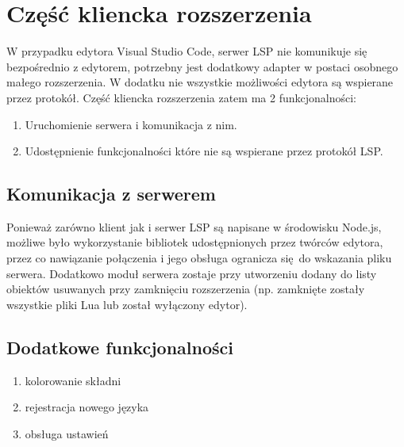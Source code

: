 \chapter{Część kliencka rozszerzenia}
W przypadku edytora Visual Studio Code, serwer LSP nie komunikuje się bezpośrednio z edytorem, potrzebny jest dodatkowy adapter w postaci osobnego małego rozszerzenia. W dodatku nie wszystkie możliwości edytora są wspierane przez protokół. Część kliencka rozszerzenia zatem ma 2 funkcjonalności:

\begin{enumerate}
    \item Uruchomienie serwera i komunikacja z nim.
    \item Udostępnienie funkcjonalności które nie są wspierane przez protokół LSP.
\end{enumerate}

\section{Komunikacja z serwerem}
Ponieważ zarówno klient jak i serwer LSP są napisane w środowisku Node.js, możliwe było wykorzystanie bibliotek udostępnionych przez twórców edytora, przez co nawiązanie połączenia i jego obsługa ogranicza się do wskazania pliku serwera. Dodatkowo moduł serwera zostaje przy utworzeniu dodany do listy obiektów usuwanych przy zamknięciu rozszerzenia (np. zamknięte zostały wszystkie pliki Lua lub został wyłączony edytor).

\section{Dodatkowe funkcjonalności}
\begin{enumerate}
    \item kolorowanie składni
    \item rejestracja nowego języka
    \item obsługa ustawień
\end{enumerate}